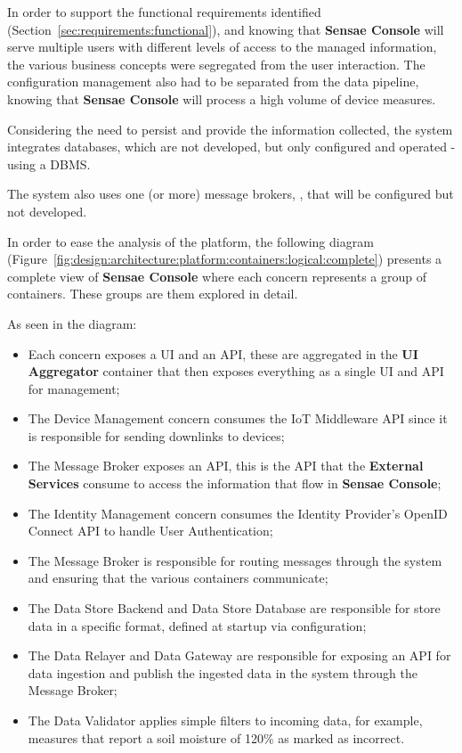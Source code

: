 In order to support the functional requirements identified (Section~\ref{sec:requirements:functional}), and knowing that \textbf{Sensae Console} will serve multiple users with different levels of access to the managed information, the various business concepts were segregated from the user interaction. The configuration management also had to be separated from the data pipeline, knowing that \textbf{Sensae Console} will process a high volume of device measures.

Considering the need to persist and provide the information collected, the system integrates databases, which are not developed, but only configured and operated - using a \gls{DBMS}.

The system also uses one (or more) message brokers, \cite{broker}, that will be configured but not developed.

In order to ease the analysis of the platform, the following diagram (Figure~\ref{fig:design:architecture:platform:containers:logical:complete}) presents a complete view of \textbf{Sensae Console} where each concern represents a group of containers. These groups are them explored in detail.

As seen in the diagram:

\begin{itemize}
   \item Each concern exposes a \gls{UI} and an \gls{API}, these are aggregated in the \textbf{UI Aggregator} container that then exposes everything as a single \gls{UI} and \gls{API} for management;
   \item The Device Management concern consumes the \gls{IoT} Middleware API since it is responsible for sending downlinks to devices;
   \item The Message Broker exposes an \gls{API}, this is the \gls{API} that the \textbf{External Services} consume to access the information that flow in \textbf{Sensae Console};
   \item The Identity Management concern consumes the Identity Provider's OpenID Connect API to handle User Authentication;
   \item The Message Broker is responsible for routing messages through the system and ensuring that the various containers communicate;
   \item The Data Store Backend and Data Store Database are responsible for store data in a specific format, defined at startup via configuration;
   \item The Data Relayer and Data Gateway are responsible for exposing an \gls{API} for data ingestion and publish the ingested data in the system through the Message Broker;
   \item The Data Validator applies simple filters to incoming data, for example, measures that report a soil moisture of 120\% as marked as incorrect.
\end{itemize}

